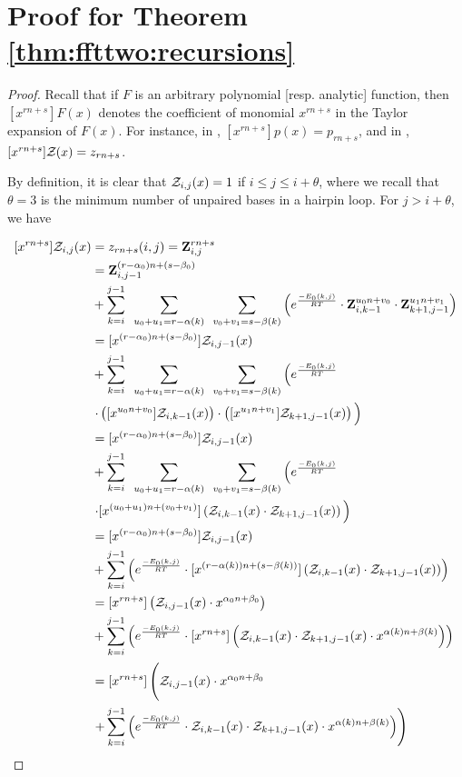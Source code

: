 \section{Proof for Theorem \ref{thm:ffttwo:recursions}}
\label{sec:ffttwo:recursions}

\begin{proof}
Recall that if $F$ is an arbitrary
polynomial [resp. analytic] function, then $[x^{rn+s}]F(x)$
denotes the coefficient of monomial $x^{rn+s}$ in the
Taylor expansion of $F(x)$. For instance, in
, $[x^{rn+s}]p(x) = p_{rn+s}$, and in
, $[x^{rn+s}]{\mathcal Z}_{}(x) = z_{rn+s}$.

By definition, it is clear that ${\mathcal Z}_{i,j}(x)=1$ if $i \leq j \leq i + \theta$,
where we recall that $\theta = 3$ is the minimum number of unpaired bases in
a hairpin loop. For $j > i + \theta$, we have

\begin{align}
\begin{split}
[x^{rn+s}] \emZ{i,j} &= z_{rn+s}(i,j) = \bfZ{rn+s}{i,j} \\
&= \bfZ{(r-\alpha_0)n+(s-\beta_0)}{i,j-1} \\
&+
\sum_{k=i}^{j-1}\enspace
\sum_{u_0+u_1=r-\alpha(k)}\enspace
\sum_{v_0+v_1=s-\beta(k)}
\left( \boltzNuss{k,j}
\cdot \bfZ{u_0 n+v_0}{i,k-1} \cdot \bfZ{u_1 n+v_1}{k+1,j-1} \right) \\
&= [x^{(r-\alpha_0)n+(s-\beta_0)}] \emZ{i,j-1} \\
&+ \sum_{k=i}^{j-1}\enspace
\sum_{u_0+u_1=r-\alpha(k)}\enspace
\sum_{v_0+v_1=s-\beta(k)}
\left( \boltzNuss{k,j} \right. \\
&\left. \cdot \left( [x^{u_0 n+v_0}] \emZ{i,k-1} \right) \cdot
\left( [x^{u_1 n+v_1}] \emZ{k+1,j-1} \right)
\vphantom{\boltzNuss{k,j}} \right) \\
&= [x^{(r-\alpha_0)n+(s-\beta_0)}] \emZ{i,j-1} \\
&+ \sum_{k=i}^{j-1}\enspace
\sum_{u_0+u_1=r-\alpha(k)}\enspace
\sum_{v_0+v_1=s-\beta(k)}
\left( \boltzNuss{k,j} \right. \\
&\left. \cdot [x^{(u_0+u_1)n+(v_0+v_1)}] \left( \emZ{i,k-1} \cdot \emZ{k+1,j-1} \right)
\vphantom{\boltzNuss{k,j}} \right) \\
&= [x^{(r-\alpha_0)n+(s-\beta_0)}] \emZ{i,j-1} \\
&+ \sum_{k=i}^{j-1} \left( \boltzNuss{k,j}
\cdot [x^{(r-\alpha(k))n+(s-\beta(k))}] \left( \emZ{i,k-1} \cdot \emZ{k+1,j-1}
\right) \right) \\
&= [x^{rn+s}] \left( \emZ{i,j-1} \cdot x^{\ab{0}} \right) \\
&+ \sum_{k=i}^{j-1} \left( \boltzNuss{k,j}
\cdot [x^{rn+s}] \left( \emZ{i,k-1} \cdot \emZ{k+1,j-1} \cdot
x^{\alpha(k)n+\beta(k)} \right) \right) \\
&= [x^{rn+s}] \left( \vphantom{\sum_{k=i}^{j-1}} \emZ{i,j-1} \cdot x^{\ab{0}} \right. \\
&\left. + \sum_{k=i}^{j-1} \left( \boltzNuss{k,j}
\cdot \emZ{i,k-1} \cdot \emZ{k+1,j-1} \cdot
x^{\alpha(k)n+\beta(k)} \right) \right) \\
\end{split}
\end{align}
\end{proof}

